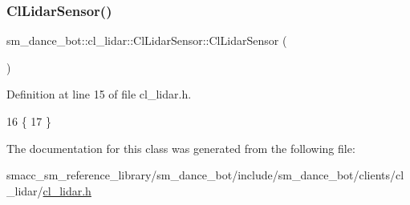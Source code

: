 \subsubsection{\texorpdfstring{Cl\+Lidar\+Sensor()}{ClLidarSensor()}}
{\footnotesize\ttfamily sm\+\_\+dance\+\_\+bot\+::cl\+\_\+lidar\+::\+Cl\+Lidar\+Sensor\+::\+Cl\+Lidar\+Sensor (\begin{DoxyParamCaption}{ }\end{DoxyParamCaption})\hspace{0.3cm}{\ttfamily [inline]}}



Definition at line 15 of file cl\+\_\+lidar.\+h.


\begin{DoxyCode}
16     \{
17     \}
\end{DoxyCode}


The documentation for this class was generated from the following file\+:\begin{DoxyCompactItemize}
\item 
smacc\+\_\+sm\+\_\+reference\+\_\+library/sm\+\_\+dance\+\_\+bot/include/sm\+\_\+dance\+\_\+bot/clients/cl\+\_\+lidar/\hyperlink{sm__dance__bot_2include_2sm__dance__bot_2clients_2cl__lidar_2cl__lidar_8h}{cl\+\_\+lidar.\+h}\end{DoxyCompactItemize}
